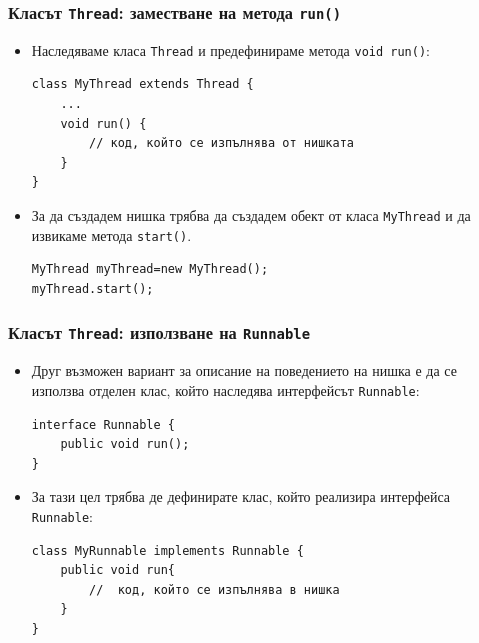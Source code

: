 \documentclass[ignorenonframetext, hyperref=unicode,compress]{beamer}
\begin{document}
\begin{frame}[containsverbatim]
\frametitle{Класът \lstinline{Thread}: заместване на метода \lstinline{run()}}
\begin{itemize}
\item Наследяваме класа \lstinline{Thread} и предефинираме метода
\lstinline{void run()}:
\begin{lstlisting}
class MyThread extends Thread {
	...
	void run() {
		// код, който се изпълнява от нишката
	}
}
\end{lstlisting}

\item За да създадем нишка трябва да създадем обект от класа
\lstinline{MyThread} и да извикаме метода \lstinline{start()}.
\begin{lstlisting}
MyThread myThread=new MyThread();
myThread.start();
\end{lstlisting}
\end{itemize}
\end{frame}

\begin{frame}[containsverbatim]
\frametitle{Класът \lstinline{Thread}: използване на \lstinline{Runnable} }
\begin{itemize}
\item Друг възможен вариант за описание на поведението на нишка е да се
използва отделен клас, който наследява интерфейсът \lstinline{Runnable}:
\begin{lstlisting}
interface Runnable {
	public void run();
}
\end{lstlisting}
\item За тази цел трябва де дефинирате клас, който реализира интерфейса
\lstinline{Runnable}:
\begin{lstlisting}
class MyRunnable implements Runnable {
	public void run{
		//  код, който се изпълнява в нишка
	}
}
\end{lstlisting}
\end{itemize}
\end{frame}
\end{document}
